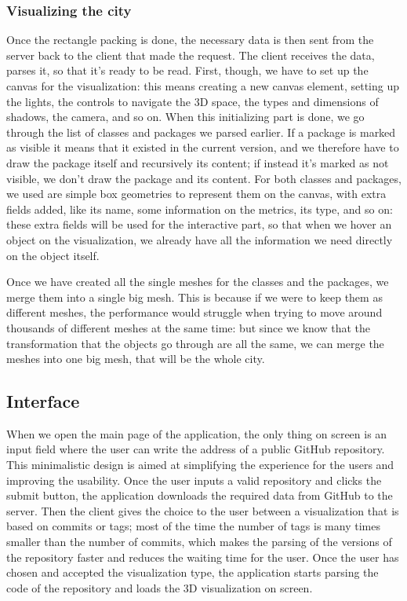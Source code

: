 \documentclass[]{usiinfbachelorproject}
\begin{document}
\subsubsection{Visualizing the city} \label{Visualizing the city}
Once the rectangle packing is done, the necessary data is then sent from the server back to the client that made the request. The client receives the data, parses it, so that it's ready to be read.
First, though, we have to set up the canvas for the visualization: this means creating a new canvas element, setting up the lights, the controls to navigate the 3D space, the types and dimensions of shadows, the camera, and so on.
When this initializing part is done, we go through the list of classes and packages we parsed earlier. If a package is marked as visible it means that it existed in the current version, and we therefore have to draw the package itself and recursively its content; if instead it's marked as not visible, we don't draw the package and its content.
For both classes and packages, we used are simple box geometries to represent them on the canvas, with extra fields added, like its name, some information on the metrics, its type, and so on: these extra fields will be used for the interactive part, so that when we hover an object on the visualization, we already have all the information we need directly on the object itself.

Once we have created all the single meshes for the classes and the packages, we merge them into a single big mesh.
This is because if we were to keep them as different meshes, the performance would struggle when trying to move around thousands of different meshes at the same time: but since we know that the transformation that the objects go through are all the same, we can merge the meshes into one big mesh, that will be the whole city.

\subsection{Interface} \label{Interface}

When we open the main page of the application, the only thing on screen is an input field where the user can write the address of a public GitHub repository. This minimalistic design is aimed at simplifying the experience for the users and improving the usability. Once the user inputs a valid repository and clicks the submit button, the application downloads the required data from GitHub to the server. Then the client gives the choice to the user between a visualization that is based on commits or tags; most of the time the number of tags is many times smaller than the number of commits, which makes the parsing of the versions of the repository faster and reduces the waiting time for the user. Once the user has chosen and accepted the visualization type, the application starts parsing the code of the repository and loads the 3D visualization on screen.
\end{document}
